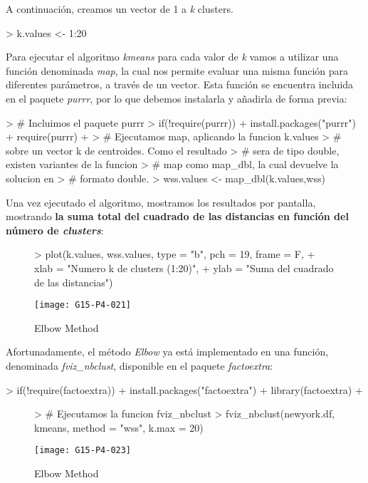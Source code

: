 \documentclass [a4paper] {article}
\begin{document}
A continuación, creamos un vector de 1 a \textit{k} clusters.

\begin{Schunk}
\begin{Sinput}
> k.values <- 1:20
\end{Sinput}
\end{Schunk}

Para ejecutar el algoritmo \textit{kmeans} para cada valor de \textit{k} vamos a utilizar una función denominada \textit{map}, la cual nos permite evaluar una misma función para diferentes parámetros, a través de un vector. Esta función se encuentra incluida en el paquete \textit{purrr}, por lo que debemos instalarla y añadirla de forma previa:

\begin{Schunk}
\begin{Sinput}
> # Incluimos el paquete purrr
> if(!require(purrr)){
+   install.packages("purrr")
+   require(purrr)
+ }
> # Ejecutamos map, aplicando la funcion k.values 
> # sobre un vector k de centroides. Como el resultado
> # sera de tipo double, existen variantes de la funcion
> # map como map_dbl, la cual devuelve la solucion en
> # formato double.
> wss.values <- map_dbl(k.values,wss)
\end{Sinput}
\end{Schunk}

Una vez ejecutado el algoritmo, mostramos los resultados por pantalla, mostrando \textbf{la suma total del cuadrado de las distancias en función del número de \textit{clusters}}:

\begin{figure}[h!]
\centering
\begin{Schunk}
\begin{Sinput}
> plot(k.values, wss.values, type = "b", pch = 19, frame = F, 
+ xlab = "Numero k de clusters (1:20)", 
+ ylab = "Suma del cuadrado de las distancias")
\end{Sinput}
\end{Schunk}
\texttt{[image: G15-P4-021]}
\caption{Elbow Method}
\end{figure}

\newpage
Afortunadamente, el método \textit{Elbow} ya está implementado en una función, denominada \textit{fviz\_nbclust}, disponible en el paquete \textit{factoextra}:
\begin{Schunk}
\begin{Sinput}
> if(!require(factoextra)){
+   install.packages("factoextra")
+   library(factoextra)
+ }
\end{Sinput}
\end{Schunk}
\begin{figure}[h!]
\centering
\begin{Schunk}
\begin{Sinput}
> # Ejecutamos la funcion fviz_nbclust
> fviz_nbclust(newyork.df, kmeans, method = "wss", k.max = 20)
\end{Sinput}
\end{Schunk}
\texttt{[image: G15-P4-023]}
\caption{Elbow Method}
\end{figure}
\end{document}
